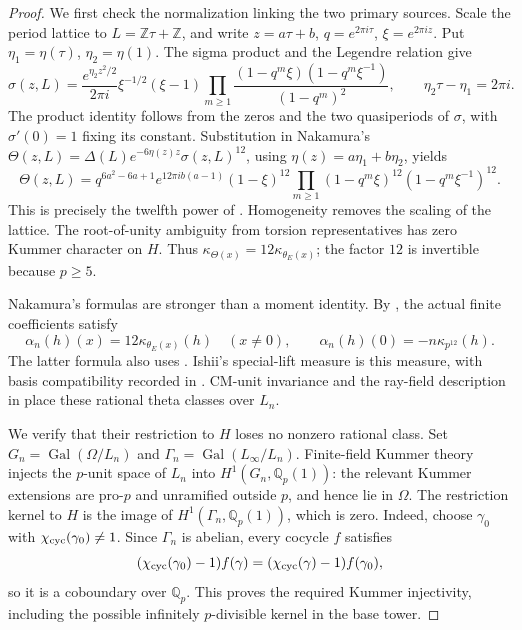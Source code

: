 \begin{proof}
We first check the normalization linking the two primary
sources.  Scale the period lattice to
\(L=\mathbb Z\tau+\mathbb Z\), and write
\(z=a\tau+b\), \(q=e^{2\pi i\tau}\),
\(\xi=e^{2\pi iz}\).  Put
\(\eta_1=\eta(\tau)\), \(\eta_2=\eta(1)\).
The sigma product and the Legendre relation give
\[
 \sigma(z,L)=\frac{e^{\eta_2z^2/2}}{2\pi i}
       \xi^{-1/2}(\xi-1)
       \prod_{m\ge1}
       \frac{(1-q^m\xi)(1-q^m\xi^{-1})}{(1-q^m)^2},
 \qquad \eta_2\tau-\eta_1=2\pi i.
\]
The product identity follows from the zeros and the two
quasiperiods of \(\sigma\), with \(\sigma'(0)=1\)
fixing its constant.  Substitution in Nakamura's
\(\Theta(z,L)=\Delta(L)e^{-6\eta(z)z}\sigma(z,L)^{12}\),
using \(\eta(z)=a\eta_1+b\eta_2\), yields
\[
 \Theta(z,L)=q^{6a^2-6a+1}e^{12\pi ib(a-1)}
    (1-\xi)^{12}
    \prod_{m\ge1}(1-q^m\xi)^{12}(1-q^m\xi^{-1})^{12}.
\]
This is precisely the twelfth power of
\cite[equation (19), p.~7]{GoncharovEuler}.
Homogeneity removes the scaling of the lattice.
The root-of-unity ambiguity from torsion representatives
has zero Kummer character on \(H\).  Thus
\(\kappa_{\Theta(x)}=12\kappa_{\theta_E(x)}\);
the factor \(12\) is invertible because \(p\ge5\).

Nakamura's formulas are stronger than a moment identity.
By \cite[equation (3.5.1), p.~209, and
equations (4.11.3)--(4.11.5), p.~220]{Nakamura1995},
the actual finite coefficients satisfy
\begin{equation}\label{eq:cm-alpha-theta-finite}
 \alpha_n(h)(x)=12\kappa_{\theta_E(x)}(h)\quad(x\ne0),
 \qquad
 \alpha_n(h)(0)=-n\kappa_{p^{12}}(h).
\end{equation}
The latter formula also uses
\cite[Proposition (3.8), p.~210]{Nakamura1995}.
Ishii's special-lift measure is this measure, with basis
compatibility recorded in
\cite[Remark 2.6.1(2), p.~8]{Ishii}.
CM-unit invariance and the ray-field description in
\cite[p.~27]{GoncharovEuler} place these rational theta
classes over \(L_n\).

We verify that their restriction to \(H\) loses no
nonzero rational class.  Set
\(G_n=\operatorname{Gal}(\Omega/L_n)\) and
\(\Gamma_n=\operatorname{Gal}(L_\infty/L_n)\).
Finite-field Kummer theory injects the \(p\)-unit
space of \(L_n\) into \(H^1(G_n,\mathbb Q_p(1))\):
the relevant Kummer extensions are pro-\(p\) and
unramified outside \(p\), and hence lie in \(\Omega\).
The restriction kernel to \(H\) is the image of
\(H^1(\Gamma_n,\mathbb Q_p(1))\), which is zero.
Indeed, choose \(\gamma_0\) with
\(\chi_{\rm cyc}(\gamma_0)\ne1\).  Since \(\Gamma_n\)
is abelian, every cocycle \(f\) satisfies
\[
 (\chi_{\rm cyc}(\gamma_0)-1)f(\gamma)
       =(\chi_{\rm cyc}(\gamma)-1)f(\gamma_0),
\]
so it is a coboundary over \(\mathbb Q_p\).
This proves the required Kummer injectivity, including
the possible infinitely \(p\)-divisible kernel in the
base tower.


\end{proof}
